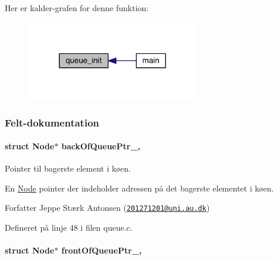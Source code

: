 Her er kalder-\/grafen for denne funktion\+:
\nopagebreak
\begin{figure}[H]
\begin{center}
\leavevmode
\includegraphics[width=216pt]{d4/da4/class_queue_a4e0a3758d721506e7729f4d074a280ff_icgraph}
\end{center}
\end{figure}




\subsubsection{Felt-\/dokumentation}
\paragraph[{\texorpdfstring{back\+Of\+Queue\+Ptr\+\_\+}{backOfQueuePtr_}}]{\setlength{\rightskip}{0pt plus 5cm}struct {\bf Node}$\ast$ back\+Of\+Queue\+Ptr\+\_\+\hspace{0.3cm}{\ttfamily [static]}, {\ttfamily [private]}}\hypertarget{class_queue_a225d2c9ad4e83d6da443e99b8869a51c}{}\label{class_queue_a225d2c9ad4e83d6da443e99b8869a51c}


Pointer til bagerste element i køen. 

En \hyperlink{queue_8c_db/d8b/struct_node}{Node} pointer der indeholder adressen på det bagerste elementet i køen.

\begin{DoxyAuthor}{Forfatter}
Jeppe Stærk Antonsen (\href{mailto:201271201@uni.au.dk}{\tt 201271201@uni.\+au.\+dk}) 
\end{DoxyAuthor}


Defineret på linje 48 i filen queue.\+c.

\paragraph[{\texorpdfstring{front\+Of\+Queue\+Ptr\+\_\+}{frontOfQueuePtr_}}]{\setlength{\rightskip}{0pt plus 5cm}struct {\bf Node}$\ast$ front\+Of\+Queue\+Ptr\+\_\+\hspace{0.3cm}{\ttfamily [static]}, {\ttfamily [private]}}\hypertarget{class_queue_aa48f05218d0a78402821c8aa9bdad06a}{}\label{class_queue_aa48f05218d0a78402821c8aa9bdad06a}


